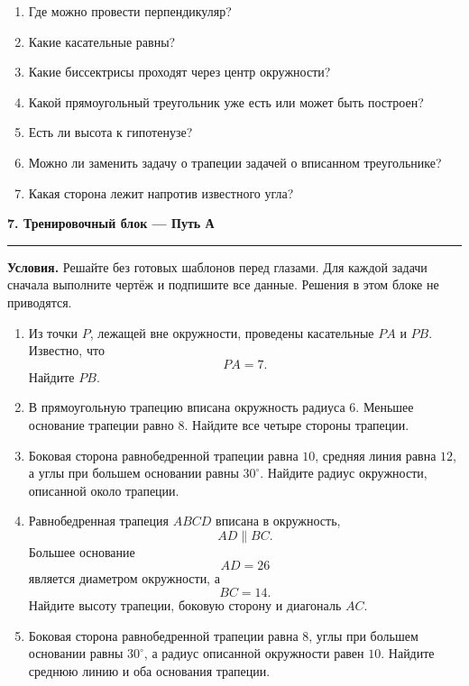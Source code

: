 \documentclass[a4paper,12pt]{article}
\newcommand{\Section}[1]{%
    \vspace{0.4em}%
    {\Large\bfseries\color{darkaccent}#1}\par
    \vspace{0.25em}
    \noindent
    \textcolor{linegray}{\rule{\linewidth}{0.6pt}}
    \vspace{0.5em}%
}
\begin{document}
\begin{enumerate}

    \item Где можно провести перпендикуляр?

    \item Какие касательные равны?

    \item Какие биссектрисы проходят
    через центр окружности?

    \item Какой прямоугольный треугольник
    уже есть или может быть построен?

    \item Есть ли высота к гипотенузе?

    \item Можно ли заменить задачу о трапеции
    задачей о вписанном треугольнике?

    \item Какая сторона лежит
    напротив известного угла?

\end{enumerate}

\clearpage

\Section{7. Тренировочный блок — Путь А}

\textbf{Условия.}
Решайте без готовых шаблонов перед глазами.
Для каждой задачи сначала выполните чертёж
и подпишите все данные.
Решения в этом блоке не приводятся.

\begin{enumerate}[label=\textbf{\arabic*.}]

    \item
    Из точки $P$, лежащей вне окружности,
    проведены касательные $PA$ и $PB$.
    Известно, что
    \[
        PA=7.
    \]
    Найдите $PB$.

    \item
    В прямоугольную трапецию
    вписана окружность радиуса $6$.
    Меньшее основание трапеции равно $8$.
    Найдите все четыре стороны трапеции.

    \item
    Боковая сторона равнобедренной трапеции
    равна $10$,
    средняя линия равна $12$,
    а углы при большем основании
    равны $30^\circ$.
    Найдите радиус окружности,
    описанной около трапеции.

    \item
    Равнобедренная трапеция $ABCD$
    вписана в окружность,
    \[
        AD\parallel BC.
    \]
    Большее основание
    \[
        AD=26
    \]
    является диаметром окружности,
    а
    \[
        BC=14.
    \]
    Найдите высоту трапеции,
    боковую сторону
    и диагональ $AC$.

    \item
    Боковая сторона равнобедренной трапеции
    равна $8$,
    углы при большем основании
    равны $30^\circ$,
    а радиус описанной окружности
    равен $10$.
    Найдите среднюю линию
    и оба основания трапеции.

\end{enumerate}
\end{document}
